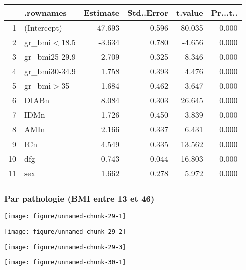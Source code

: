 \documentclass[11pt,a4paper]{article}\usepackage[]{graphicx}\usepackage[]{color}
\makeatletter
\def\maxwidth{ %
  \ifdim\Gin@nat@width>\linewidth
    \linewidth
  \else
    \Gin@nat@width
  \fi
}
\newenvironment{knitrout}{}{} %
\makeatother
\begin{document}
\begin{table}[H]
\centering
\begin{tabular}{rlrrrr}
  \hline
 & .rownames & Estimate & Std..Error & t.value & Pr...t.. \\ 
  \hline
1 & (Intercept) & 47.693 & 0.596 & 80.035 & 0.000 \\ 
  2 & gr\_bmi$<$18.5 & -3.634 & 0.780 & -4.656 & 0.000 \\ 
  3 & gr\_bmi25-29.9 & 2.709 & 0.325 & 8.346 & 0.000 \\ 
  4 & gr\_bmi30-34.9 & 1.758 & 0.393 & 4.476 & 0.000 \\ 
  5 & gr\_bmi$>$35 & -1.684 & 0.462 & -3.647 & 0.000 \\ 
  6 & DIABn & 8.084 & 0.303 & 26.645 & 0.000 \\ 
  7 & IDMn & 1.726 & 0.450 & 3.839 & 0.000 \\ 
  8 & AMIn & 2.166 & 0.337 & 6.431 & 0.000 \\ 
  9 & ICn & 4.549 & 0.335 & 13.562 & 0.000 \\ 
  10 & dfg & 0.743 & 0.044 & 16.803 & 0.000 \\ 
  11 & sex & 1.662 & 0.278 & 5.972 & 0.000 \\ 
   \hline
\end{tabular}
\end{table}


\subsubsection*{Par pathologie (BMI entre 13 et 46)}

\begin{knitrout}
\color{fgcolor}
\texttt{[image: figure/unnamed-chunk-29-1]} 

\texttt{[image: figure/unnamed-chunk-29-2]} 

\texttt{[image: figure/unnamed-chunk-29-3]} 

\end{knitrout}

\begin{knitrout}
\color{fgcolor}
\texttt{[image: figure/unnamed-chunk-30-1]} 

\end{knitrout}
\end{document}
